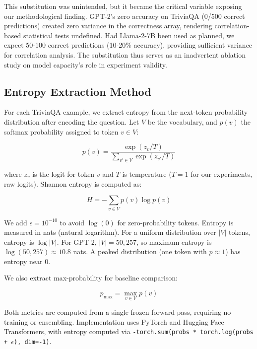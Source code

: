 This substitution was unintended, but it became the critical variable exposing our methodological finding. GPT-2's zero accuracy on TriviaQA (0/500 correct predictions) created zero variance in the correctness array, rendering correlation-based statistical tests undefined. Had Llama-2-7B been used as planned, we expect 50-100 correct predictions (10-20\% accuracy), providing sufficient variance for correlation analysis. The substitution thus serves as an inadvertent ablation study on model capacity's role in experiment validity.

\subsection{Entropy Extraction Method}

For each TriviaQA example, we extract entropy from the next-token probability distribution after encoding the question. Let $V$ be the vocabulary, and $p(v)$ the softmax probability assigned to token $v \in V$:

\begin{equation}
p(v) = \frac{\exp(z_v / T)}{\sum_{v' \in V} \exp(z_{v'} / T)}
\end{equation}

where $z_v$ is the logit for token $v$ and $T$ is temperature ($T=1$ for our experiments, raw logits). Shannon entropy is computed as:

\begin{equation}
H = -\sum_{v \in V} p(v) \log p(v)
\end{equation}

We add $\epsilon = 10^{-10}$ to avoid $\log(0)$ for zero-probability tokens. Entropy is measured in nats (natural logarithm). For a uniform distribution over $|V|$ tokens, entropy is $\log|V|$. For GPT-2, $|V| = 50{,}257$, so maximum entropy is $\log(50{,}257) \approx 10.8$ nats. A peaked distribution (one token with $p \approx 1$) has entropy near 0.

We also extract max-probability for baseline comparison:

\begin{equation}
p_{\max} = \max_{v \in V} p(v)
\end{equation}

Both metrics are computed from a single frozen forward pass, requiring no training or ensembling. Implementation uses PyTorch and Hugging Face Transformers, with entropy computed via \texttt{-torch.sum(probs * torch.log(probs + $\epsilon$), dim=-1)}.

